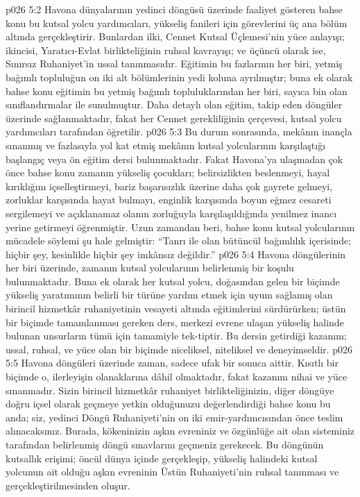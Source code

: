 \vs p026 5:2 Havona dünyalarının yedinci döngüsü üzerinde faaliyet gösteren bahse konu bu kutsal yolcu yardımcıları, yükseliş fanileri için görevlerini üç ana bölüm altında gerçekleştirir. Bunlardan ilki, Cennet Kutsal Üçlemesi’nin yüce anlayışı; ikincisi, Yaratıcı\hyp{}Evlat birlikteliğinin ruhsal kavrayışı; ve üçüncü olarak ise, Sınırsız Ruhaniyet’in ussal tanınmasıdır. Eğitimin bu fazlarının her biri, yetmiş bağımlı topluluğun on iki alt bölümlerinin yedi koluna ayrılmıştır; buna ek olarak bahse konu eğitimin bu yetmiş bağımlı topluluklarından her biri, sayıca bin olan sınıflandırmalar ile sunulmuştur. Daha detaylı olan eğitim, takip eden döngüler üzerinde sağlanmaktadır, fakat her Cennet gerekliliğinin çerçevesi, kutsal yolcu yardımcıları tarafından öğretilir.
\vs p026 5:3 Bu durum sonrasında, mekânın inançla sınanmış ve fazlasıyla yol kat etmiş mekânın kutsal yolcularının karşılaştığı başlangıç veya ön eğitim dersi bulunmaktadır. Fakat Havona’ya ulaşmadan çok önce bahse konu zamanın yükseliş çocukları; belirsizlikten beslenmeyi, hayal kırıklığını içselleştirmeyi, bariz başarısızlık üzerine daha çok gayrete gelmeyi, zorluklar karşısında hayat bulmayı, enginlik karşısında boyun eğmez cesareti sergilemeyi ve açıklanamaz olanın zorluğuyla karşılaşıldığında yenilmez inancı yerine getirmeyi öğrenmiştir. Uzun zamandan beri, bahse konu kutsal yolcularının mücadele söylemi şu hale gelmiştir: “Tanrı ile olan bütüncül bağımlılık içerisinde; hiçbir şey, kesinlikle hiçbir şey imkânsız değildir.”
\vs p026 5:4 Havona döngülerinin her biri üzerinde, zamanın kutsal yolcularının belirlenmiş bir koşulu bulunmaktadır. Buna ek olarak her kutsal yolcu, doğasından gelen bir biçimde yükseliş yaratımının belirli bir türüne yardım etmek için uyum sağlamış olan birincil hizmetkâr ruhaniyetinin vesayeti altında eğitimlerini sürdürürken; üstün bir biçimde tamamlanması gereken ders, merkezi evrene ulaşan yükseliş halinde bulunan unsurların tümü için tamamiyle tek\hyp{}tiptir. Bu dersin getirdiği kazanım; ussal, ruhsal, ve yüce olan bir biçimde niceliksel, niteliksel ve deneyimseldir.
\vs p026 5:5 Havona döngüleri üzerinde zaman, sadece ufak bir sonuca aittir. Kısıtlı bir biçimde o, ilerleyişin olanaklarına dâhil olmaktadır, fakat kazanım nihai ve yüce sınanmadır. Sizin birincil hizmetkâr ruhaniyet birlikteliğinizin, diğer döngüye doğru içsel olarak geçmeye yetkin olduğunuzu değerlendirdiği bahse konu bu anda; siz, yedinci Döngü Ruhaniyeti’nin on iki emir\hyp{}yardımcısından önce teslim alınacaksınız. Burada, kökeninizin aşkın evreniniz ve özgünlüğe ait olan sisteminiz tarafından belirlenmiş döngü sınavlarını geçmeniz gerekecek. Bu döngünün kutsallık erişimi; öncül dünya içinde gerçekleşip, yükseliş halindeki kutsal yolcunun ait olduğu aşkın evreninin Üstün Ruhaniyeti’nin ruhsal tanınması ve gerçekleştirilmesinden oluşur.
